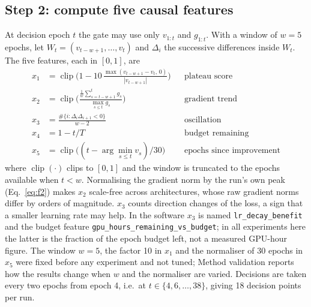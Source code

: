 \subsection*{Step 2: compute five causal features}
At decision epoch $t$ the gate may use only $v_{1:t}$ and $g_{1:t}$. With a window of $w=5$ epochs, let $W_t=(v_{t-w+1},\dots,v_t)$ and $\Delta_i$ the successive differences inside $W_t$. The five features, each in $[0,1]$, are
\begin{align}
x_1 &= \operatorname{clip}\!\Big(1-10\,\frac{\max(v_{t-w+1}-v_t,\,0)}{|v_{t-w+1}|}\Big) && \text{plateau score}\label{eq:f1}\\
x_2 &= \operatorname{clip}\!\Big(\frac{\tfrac1w\sum_{s=t-w+1}^{t} g_s}{\max_{s\le t} g_s}\Big) && \text{gradient trend}\label{eq:f2}\\
x_3 &= \frac{\#\{i:\Delta_i\Delta_{i+1}<0\}}{w-2} && \text{oscillation}\label{eq:f3}\\
x_4 &= 1-t/T && \text{budget remaining}\label{eq:f4}\\
x_5 &= \operatorname{clip}\!\big((t-\arg\min_{s\le t} v_s)/30\big) && \text{epochs since improvement}\label{eq:f5}
\end{align}
where $\operatorname{clip}(\cdot)$ clips to $[0,1]$ and the window is truncated to the epochs available when $t<w$. Normalising the gradient norm by the run's own peak (Eq.~\ref{eq:f2}) makes $x_2$ scale-free across architectures, whose raw gradient norms differ by orders of magnitude. $x_3$ counts direction changes of the loss, a sign that a smaller learning rate may help. In the software $x_3$ is named \texttt{lr\_decay\_benefit} and the budget feature \texttt{gpu\_hours\_remaining\_vs\_budget}; in all experiments here the latter is the fraction of the epoch budget left, not a measured GPU-hour figure. The window $w=5$, the factor 10 in $x_1$ and the normaliser of 30 epochs in $x_5$ were fixed before any experiment and not tuned; Method validation reports how the results change when $w$ and the normaliser are varied. Decisions are taken every two epochs from epoch 4, i.e.\ at $t\in\{4,6,\dots,38\}$, giving 18 decision points per run.

